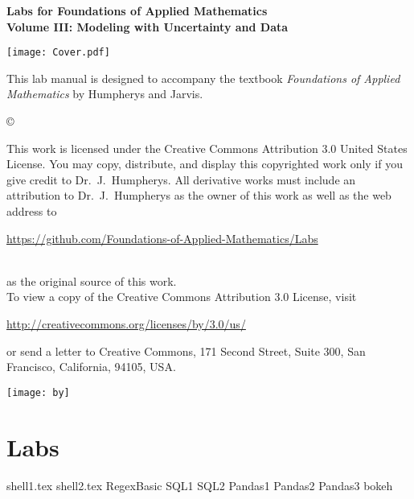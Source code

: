 \documentclass[nociteref]{SIAM-GH-book}
\begin{document}

\thispagestyle{empty} %

\begin{center}
{\huge \bf Labs for Foundations of Applied Mathematics} \\
\vspace{5mm}
{\Large \bf Volume III: Modeling with Uncertainty and Data}
\vspace{20mm}

\texttt{[image: Cover.pdf]}
\end{center}
\frontmatter



\begin{thepreface} %

This lab manual is designed to accompany the textbook \emph{Foundations of Applied Mathematics} by Humpherys and Jarvis.

\vfill
\copyright{This work is licensed under the Creative Commons Attribution 3.0 United States
License.  You may copy, distribute, and display this copyrighted work only if you give
credit to Dr.~J.~Humpherys. All derivative works must include an attribution to Dr.~J.~Humpherys as the owner of this work as well as the web address to
\\\centerline{\url{https://github.com/Foundations-of-Applied-Mathematics/Labs}}\\as the original source of this work.
\\To view a copy of the Creative Commons Attribution 3.0 License, visit
\\\centerline{\url{http://creativecommons.org/licenses/by/3.0/us/}} or send a letter to Creative Commons, 171 Second Street, Suite 300, San Francisco, California, 94105, USA.}

\vfill
\centering\texttt{[image: by]}
\vfill
\end{thepreface}

\setcounter{tocdepth}{1}
\tableofcontents

\mainmatter %

\part{Labs} %
{shell1.tex}
{shell2.tex}
{RegexBasic}
{SQL1}
{SQL2}
{Pandas1}
{Pandas2}
{Pandas3}
{bokeh}
\end{document}
